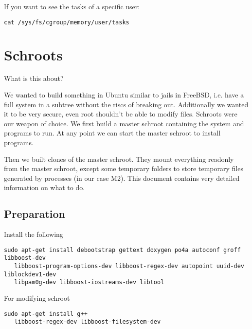 \documentclass[a4paper]{book}
\begin{document}
If you want to see the tasks of a specific user:
\begin{verbatim}
cat /sys/fs/cgroup/memory/user/tasks
\end{verbatim}

\chapter{Schroots}
What is this about?

We wanted to build something in Ubuntu similar to jails in FreeBSD, i.e. have a
full system in a subtree without the riscs of breaking out.  Additionally we
wanted it to be very secure, even root shouldn't be able to modify files.
Schroots were our weapon of choice. We first build a master schroot containing
the system and programs to run. At any point we can start the master schroot to
install programs.

Then we built clones of the master schroot. They mount everything readonly from
the master schroot, except some temporary folders to store temporary files
generated by processes (in our case M2). This document contains very detailed
information on what to do.

\section{Preparation}

Install the following

\begin{verbatim}
sudo apt-get install debootstrap gettext doxygen po4a autoconf groff libboost-dev
   libboost-program-options-dev libboost-regex-dev autopoint uuid-dev liblockdev1-dev
   libpam0g-dev libboost-iostreams-dev libtool
\end{verbatim}

For modifying schroot

\begin{verbatim}
sudo apt-get install g++
   libboost-regex-dev libboost-filesystem-dev
\end{verbatim}
\end{document}
